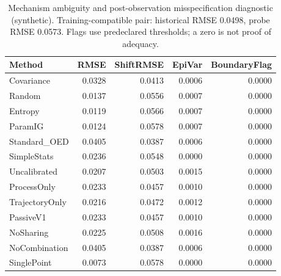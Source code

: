\begin{table}[t]
\caption{Mechanism ambiguity and post-observation misspecification diagnostic (synthetic). Training-compatible pair: historical RMSE 0.0498, probe RMSE 0.0573. Flags use predeclared thresholds; a zero is not proof of adequacy.}
\label{tab:experiment1}
\begin{tabular}{lrrrr}
\toprule
Method & RMSE & ShiftRMSE & EpiVar & BoundaryFlag \\
\midrule
Covariance & 0.0328 & 0.0413 & 0.0006 & 0.0000 \\
Random & 0.0137 & 0.0556 & 0.0007 & 0.0000 \\
Entropy & 0.0119 & 0.0566 & 0.0007 & 0.0000 \\
ParamIG & 0.0124 & 0.0578 & 0.0007 & 0.0000 \\
Standard\_OED & 0.0405 & 0.0387 & 0.0006 & 0.0000 \\
SimpleStats & 0.0236 & 0.0548 & 0.0000 & 0.0000 \\
Uncalibrated & 0.0207 & 0.0503 & 0.0015 & 0.0000 \\
ProcessOnly & 0.0233 & 0.0457 & 0.0010 & 0.0000 \\
TrajectoryOnly & 0.0216 & 0.0472 & 0.0012 & 0.0000 \\
PassiveV1 & 0.0233 & 0.0457 & 0.0010 & 0.0000 \\
NoSharing & 0.0225 & 0.0508 & 0.0016 & 0.0000 \\
NoCombination & 0.0405 & 0.0387 & 0.0006 & 0.0000 \\
SinglePoint & 0.0073 & 0.0578 & 0.0000 & 0.0000 \\
\bottomrule
\end{tabular}
\end{table}
